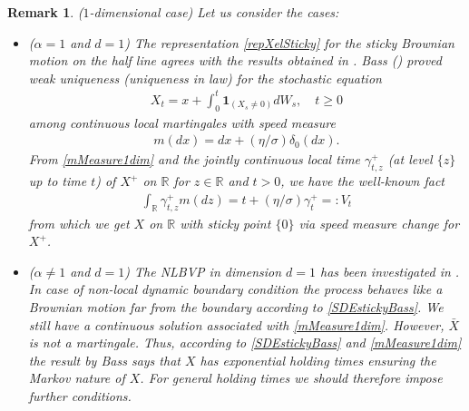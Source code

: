 \documentclass[11pt,a4paper]{article}
\newtheorem{remark}{Remark}[section]
\begin{document}
\begin{remark}
($1$-dimensional case) Let us consider the cases:
\begin{itemize}
\item ($\alpha=1$ and $d=1$) The representation \eqref{repXelSticky} for the sticky Brownian motion on the half line agrees with the results obtained in \cite[Section 10]{ItoMcK}. Bass (\cite{BasSticky}) proved weak uniqueness (uniqueness in law) for the stochastic equation
\begin{align}
X_t = x + \int_0^t \mathbf{1}_{(X_s \neq 0)} dW_s, \quad t\geq 0
\label{SDEstickyBass}
\end{align}
among continuous local martingales with speed measure
\begin{align}
m(dx) = dx + (\eta/\sigma) \delta_0(dx).
\label{mMeasure1dim}
\end{align}
From \eqref{mMeasure1dim} and the jointly continuous local time $\gamma^+_{t,z}$ (at level $\{z\}$ up to time $t$) of $X^+$ on $\mathbb{R}$ for $z \in \mathbb{R}$ and $t>0$, we have the well-known fact
\begin{align}
\int_{\mathbb{R}} \gamma^+_{t,z} m(dz) = t + (\eta/\sigma) \gamma^+_t=: V_t
\label{speedChangeV}
\end{align}
from which we get $X$ on $\mathbb{R}$ with sticky point $\{0\}$ via speed measure change for $X^+$. 
\item ($\alpha \neq 1$ and $d=1$) The NLBVP in dimension $d=1$ has been investigated in \cite{NLBVP-ItheHline}. In case of non-local dynamic boundary condition the process behaves like a Brownian motion far from the boundary according to \eqref{SDEstickyBass}. We still have a continuous solution associated with \eqref{mMeasure1dim}. However, $\bar{X}$ is not a martingale. Thus, according to \eqref{SDEstickyBass} and \eqref{mMeasure1dim} the result by Bass says that $X$ has exponential holding times ensuring the Markov nature of $X$. For general holding times we should therefore impose further conditions.
\end{itemize}
\end{remark}
\end{document}
